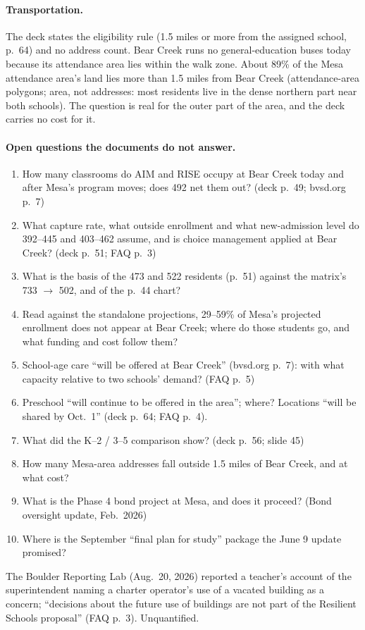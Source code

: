 \documentclass[11pt]{article}
\begin{document}
\paragraph{Transportation.} The deck states the eligibility rule (1.5 miles or more from the assigned school, p.\ 64) and no address count. Bear Creek runs no general-education buses today because its attendance area lies within the walk zone. About 89\% of the Mesa attendance area's land lies more than 1.5 miles from Bear Creek (attendance-area polygons; area, not addresses: most residents live in the dense northern part near both schools). The question is real for the outer part of the area, and the deck carries no cost for it.

\paragraph{Open questions the documents do not answer.}
\begin{enumerate}
\item How many classrooms do AIM and RISE occupy at Bear Creek today and after Mesa's program moves; does 492 net them out? (deck p.\ 49; bvsd.org p.\ 7)
\item What capture rate, what outside enrollment and what new-admission level do 392--445 and 403--462 assume, and is choice management applied at Bear Creek? (deck p.\ 51; FAQ p.\ 3)
\item What is the basis of the 473 and 522 residents (p.\ 51) against the matrix's 733 $\to$ 502, and of the p.\ 44 chart?
\item Read against the standalone projections, 29--59\% of Mesa's projected enrollment does not appear at Bear Creek; where do those students go, and what funding and cost follow them?
\item School-age care ``will be offered at Bear Creek'' (bvsd.org p.\ 7): with what capacity relative to two schools' demand? (FAQ p.\ 5)
\item Preschool ``will continue to be offered in the area''; where? Locations ``will be shared by Oct.\ 1'' (deck p.\ 64; FAQ p.\ 4).
\item What did the K--2 / 3--5 comparison show? (deck p.\ 56; slide 45)
\item How many Mesa-area addresses fall outside 1.5 miles of Bear Creek, and at what cost?
\item What is the Phase 4 bond project at Mesa, and does it proceed? (Bond oversight update, Feb.\ 2026)
\item Where is the September ``final plan for study'' package the June 9 update promised?
\end{enumerate}
The Boulder Reporting Lab (Aug.\ 20, 2026) reported a teacher's account of the superintendent naming a charter operator's use of a vacated building as a concern; ``decisions about the future use of buildings are not part of the Resilient Schools proposal'' (FAQ p.\ 3). Unquantified.
\end{document}
